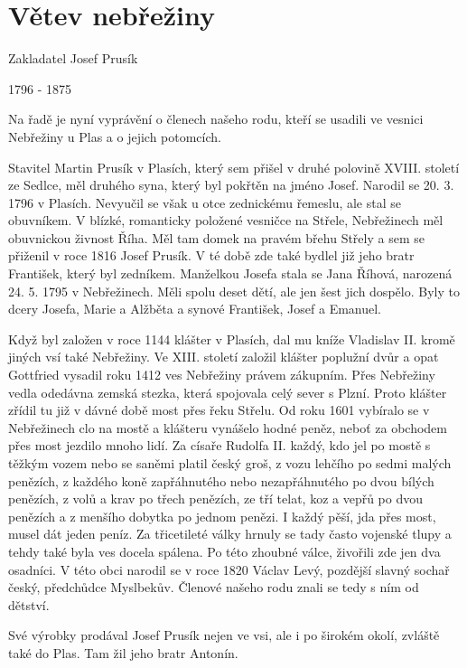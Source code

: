 \documentclass[../dejiny-rodu-prusiku.tex]{subfiles}
\begin{document}
\chapter{Větev nebřežiny}

Zakladatel Josef Prusík

1796 - 1875

Na řadě je nyní vyprávění o členech našeho rodu, kteří se usadili ve vesnici Nebřežiny u Plas a o jejich potomcích.

Stavitel Martin Prusík v Plasích, který sem přišel v druhé polovině XVIII. století ze Sedlce, měl druhého syna, který byl pokřtěn na jméno Josef. Narodil se 20. 3. 1796 v Plasích. Nevyučil se však u otce zednickému řemeslu, ale stal se obuvníkem. V blízké, romanticky položené vesničce na Střele, Nebřežinech měl obuvnickou živnost Říha. Měl tam domek na pravém břehu Střely a sem se přiženil v roce 1816 Josef Prusík. V té době zde také bydlel již jeho bratr František, který byl zedníkem. Manželkou Josefa stala se Jana Říhová, narozená 24. 5. 1795 v Nebřežinech. Měli spolu deset dětí, ale jen šest jich dospělo. Byly to dcery Josefa, Marie a Alžběta a synové František, Josef a Emanuel.

Když byl založen v roce 1144 klášter v Plasích, dal mu kníže Vladislav II. kromě jiných vsí také Nebřežiny. Ve XIII. století založil klášter poplužní dvůr a opat Gottfried vysadil roku 1412 ves Nebřežiny právem zákupním. Přes Nebřežiny vedla odedávna zemská stezka, která spojovala celý sever s Plzní. Proto klášter zřídil tu již v dávné době most přes řeku Střelu. Od roku 1601 vybíra­lo se v Nebřežinech clo na mostě a klášteru vynášelo hodné peněz, neboť za obchodem přes most jezdilo mnoho lidí. Za císaře Rudolfa II. každý, kdo jel po mostě s těžkým vozem nebo se saněmi platil český groš, z vozu lehčího po sedmi malých penězích, z každého koně zapřáhnu­tého nebo nezapřáhnutého po dvou bílých penězích, z vo­lů a krav po třech penězích, ze tří telat, koz a vepřů po dvou penězích a z menšího dobytka po jednom penězi. I každý pěší, jda přes most, musel dát jeden peníz. Za třicetileté války hrnuly se tady často vojenské tlupy a tehdy také byla ves docela spálena. Po této zhoubné vál­ce, živořili zde jen dva osadníci. V této obci narodil se v roce 1820 Václav Levý, pozdější slavný sochař čes­ký, předchůdce Myslbekův. Členové našeho rodu znali se tedy s ním od dětství.

Své výrobky prodával Josef Prusík nejen ve vsi, ale i po širokém okolí, zvláště také do Plas. Tam žil jeho bratr Antonín.
\end{document}
